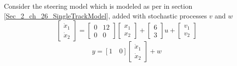 Consider the steering model which is modeled as per in section \ref{Sec_2_ch_26_SingleTrackModel}, added with stochastic processes $v$ and $w$
\begin{equation}
\begin{bmatrix}
\dot{x}_{1} \\ \dot{x}_{2}
\end{bmatrix} = \begin{bmatrix}
0 & 12 \\ 0 & 0
\end{bmatrix}\begin{bmatrix}
{x}_{1} \\ {x}_{2}
\end{bmatrix} + \begin{bmatrix}
6 \\ 3
\end{bmatrix}u + \begin{bmatrix}
v_{1} \\ v_{2}
\end{bmatrix}
\end{equation}
\begin{equation}
y = [1 \quad 0] \begin{bmatrix}
\dot{x}_{1} \\ \dot{x}_{2}
\end{bmatrix} + w
\end{equation}

